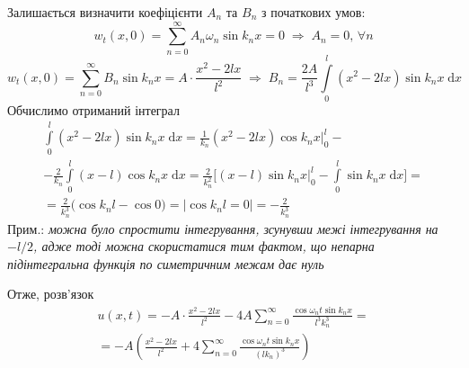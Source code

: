 Залишається визначити коефіцієнти $A_n$ та $B_n$ з початкових умов:
\begin{equation*}
    w_t(x,0) = \sum_{n=0}^{\infty} A_n\omega_n\sin k_nx = 0
    \;\Rightarrow\;
    A_n = 0,\, \forall n
\end{equation*}
\begin{equation*}
    w_t(x,0) = \sum_{n=0}^{\infty} B_n\sin k_nx = A \cdot \frac{x^2 - 2lx}{l^2} 
    \;\Rightarrow\;
    B_n = \frac{2A}{l^3} \int\limits_0^l (x^2 - 2lx) \sin k_nx \;\mathrm{d}x
\end{equation*}
Обчислимо отриманий інтеграл 
\begin{equation*}
    \begin{gathered}
        \int\limits_0^l (x^2 - 2lx) \sin k_nx \;\mathrm{d}x = \frac{1}{k_n} (x^2 - 2lx) \cos k_nx \bigg|_0^l -\\
        - \frac{2}{k_n} \int\limits_0^l (x-l) \cos k_nx \;\mathrm{d}x = \frac{2}{k_n^2} \bigg[(x-l)\sin k_nx \bigg|_0^l - \int\limits_0^l \sin k_nx \;\mathrm{d}x \bigg] =\\
        = \frac{2}{k_n^3} \big(\cos k_nl - \cos 0\big) = \bigg|\cos k_nl = 0\bigg| = -\frac{2}{k_n^3}
    \end{gathered}
\end{equation*}
Прим.: \textit{можна було спростити інтегрування, зсунувши межі інтегрування на $-l/2$, адже тоді можна скористатися тим фактом, що непарна підінтегральна функція по симетричним межам дає нуль}

Отже, розв'язок 
\begin{equation} \label{Cauchy-sol5,1}
    \begin{gathered}
        u(x,t) = - A \cdot \frac{x^2 - 2lx}{l^2} - 4A\sum_{n=0}^{\infty} \frac{\cos\omega_nt \sin k_nx}{l^3k_n^3} =\\
        = -A \left(\frac{x^2 - 2lx}{l^2} + 4\sum_{n=0}^{\infty} \frac{\cos\omega_nt \sin k_nx}{(lk_n)^3}\right)
    \end{gathered}
\end{equation}

%